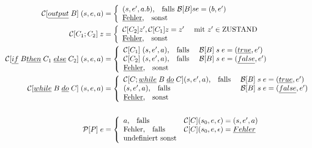 \begin{compactitem}
\begin{compactitem}
\begin{align*}
		\mathcal{C}[\underline{output}\;B]\;(s,e,a) &= \left\lbrace\begin{array}{l l} (s,e',a.b)\text{,}\quad\text{falls } \mathcal{B}[B]s e = (b,e')\\
		\underline{\text{Fehler}}\text{,}\quad\text{sonst} \end{array}\right.\\
		\mathcal{C}[C_1;C_2]\;z &= \left\lbrace\begin{array}{l l} \mathcal{C} [C_2] z', \mathcal{C} [C_1] z = z' \quad\text{ mit } z' \in \text{ZUSTAND}\\
		\underline{\text{Fehler}}\text{,}\quad\text{sonst} \end{array}\right.\\
		\mathcal{C}[\underline{if}\;B \underline{then}\;C_1\;\underline{else}\;C_2]\;(s,e,a) &= \left\lbrace\begin{array}{l l} \mathcal{C} [C_1]\;(s,e',a)\text{,}\quad\text{falls } &\mathcal{B}[B]\;s\;e = (\underline{true}, e')\\
		\mathcal{C}[C_2]\;(s,e',a)\text{,}\quad\text{falls } & \mathcal{B}[B]\;s\;e = (\underline{false}, e')\\
		\underline{\text{Fehler}}\text{,}\quad\text{sonst} \end{array}\right.\\
		\mathcal{C}[\underline{while}\;B\;\underline{do}\;C]\;(s,e,a) &= \left\lbrace\begin{array}{l l} \mathcal{C}[C;\underline{while}\;B\;\underline{do}\;C](s,e',a)\text{,}\quad\text{falls }&\mathcal{B}[B]\;s\;e = (\underline{true}, e')\\
		(s,e',a)\text{,}\quad\text{falls }&\mathcal{B}[B]\;s\;e = (\underline{false}, e')\\
		\underline{\text{Fehler}}\text{,}\quad\text{sonst} \end{array}\right.\\
		\\
		\mathcal{P}[P]\;e &= \left\lbrace\begin{array}{l l}a\text{,}\quad\text{falls }&\mathcal{C}[C](s_0,e,\epsilon) = (s, e', a)\\
		\text{Fehler,}\quad\text{falls } &\mathcal{C}[C](s_0,e,\epsilon) = \underline{Fehler}\\
		\text{undefiniert sonst} \end{array}\right.\\
		\end{align*}
	\end{compactitem}
\end{compactitem}